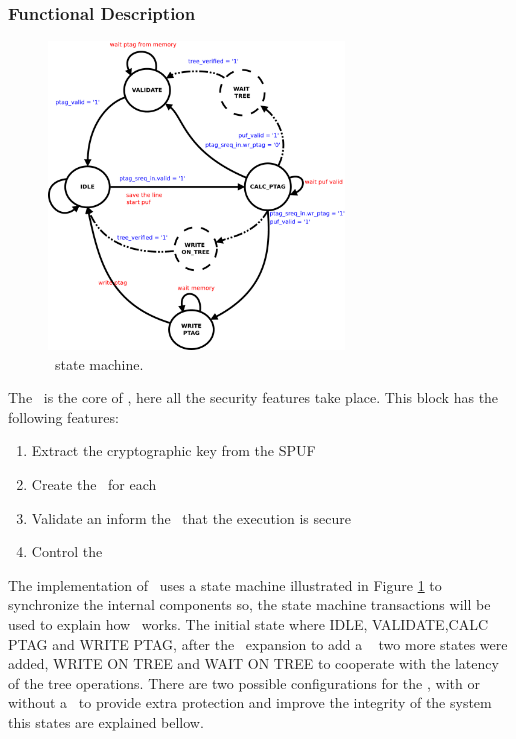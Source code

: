 \subsubsection{Functional Description}

\begin{figure}[!ht]
    \centering
    \includegraphics[width=0.70\textwidth]{figures/pdf/sec_engine_sm.pdf}
    \caption{\seceng~state  machine. }
    \label{fig:sesm}
\end{figure}

The \seceng~is the core of \cshia, here all the security features take place. This block has the following features: 
\begin{enumerate}
    \item Extract the cryptographic key from the SPUF
    \item Create the \ptags~for each \sline
    \item Validate \ptags an inform the \handler~that the execution is secure
    \item Control the \ptagmem~
\end{enumerate}
The implementation of \seceng~uses a state machine illustrated in Figure \ref{fig:sesm} to synchronize the internal components so,  the  state machine transactions will be used to explain how \seceng~works. The initial state where IDLE, VALIDATE,CALC PTAG  and WRITE PTAG, after the \cshia~expansion to add a \mt~ two more states were added, WRITE ON TREE and WAIT ON TREE  to cooperate with the  latency of the tree  operations. There are two possible configurations for the \seceng, with or without a \mt~to provide extra protection and improve the integrity of the system this states are explained bellow. 


